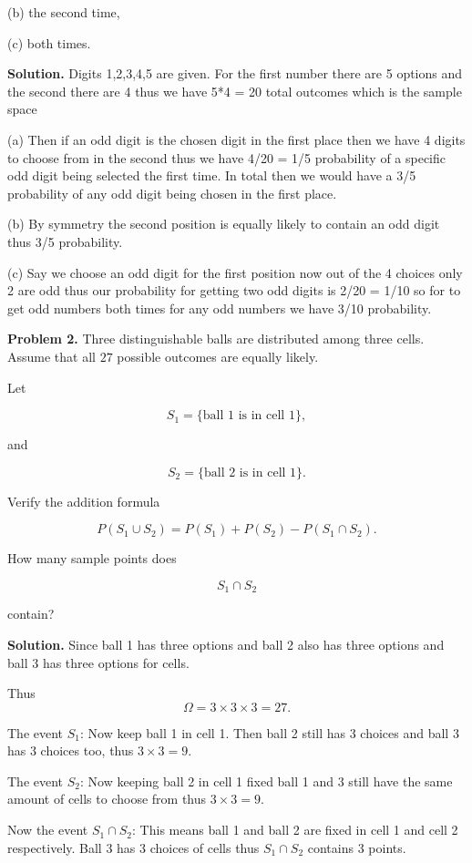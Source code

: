 \documentclass[12pt]{article}
\begin{document}
(b) the second time,

(c) both times.

\textbf{Solution.} 
Digits 1,2,3,4,5 are given.
For the first number there are 5 options and the second there are 4 thus we have 5*4 = 20 total outcomes which is the sample space

(a) Then if an odd digit is the chosen digit in the first place then we have 4 digits to choose from in the second thus we have 4/20 = 1/5 probability of a specific odd digit being selected the first time. In total then we would have a 3/5 probability of any odd digit being chosen in the first place.

(b) By symmetry the second position is equally likely to contain an odd digit thus 3/5 probability. 

(c) Say we choose an odd digit for the first position now out of the 4 choices only 2 are odd thus our probability for getting two odd digits is 2/20 = 1/10 so for to get odd numbers both times for any odd numbers we have 3/10 probability.  

\textbf{Problem 2.} Three distinguishable balls are distributed among three cells. Assume that all
\(27\) possible outcomes are equally likely.

Let

\[
S_1 = \{\text{ball 1 is in cell 1}\},
\]

and

\[
S_2 = \{\text{ball 2 is in cell 1}\}.
\]

Verify the addition formula

\[
P(S_1 \cup S_2)
=
P(S_1)
+
P(S_2)
-
P(S_1 \cap S_2).
\]

How many sample points does

\[
S_1 \cap S_2
\]

contain?

\textbf{Solution.}
Since ball 1 has three options and ball 2 also has three options and ball 3 has three options for cells. 

Thus \[\Omega = 3\times3\times3 = 27.\]

The event $S_1$: Now keep ball 1 in cell 1. Then ball 2 still has 3 choices and ball 3 has 3 choices too, thus $3 \times 3 = 9$.

The event $S_2$: Now keeping ball 2 in cell 1 fixed ball 1 and 3 still have the same amount of cells to choose from thus $3 \times 3 = 9$.

Now the event $S_1 \cap S_2$: This means ball 1 and ball 2 are fixed in cell 1 and cell 2 respectively. Ball 3 has 3 choices of cells thus $S_1 \cap S_2$ contains 3 points.
\end{document}

